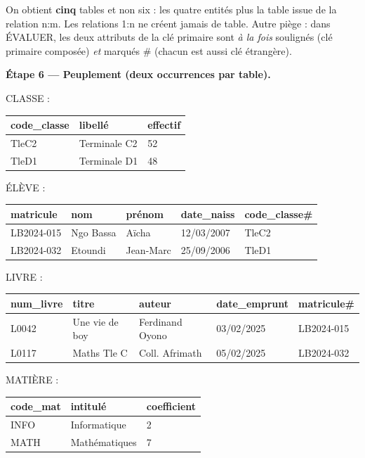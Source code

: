 \documentclass[11pt]{article}
\begin{document}
\begin{exoresolu}
\begin{attention}
On obtient \textbf{cinq} tables et non six : les quatre entités plus la table issue de la relation n:m. Les relations 1:n ne créent jamais de table. Autre piège : dans ÉVALUER, les deux attributs de la clé primaire sont \emph{à la fois} soulignés (clé primaire composée) \emph{et} marqués \# (chacun est aussi clé étrangère).
\end{attention}

\textbf{Étape 6 — Peuplement (deux occurrences par table).}

CLASSE :
\begin{center}
\begin{tabularx}{\linewidth}{|l|X|l|}
\hline
\rowcolor{popblueL} \textbf{code\_classe} & \textbf{libellé} & \textbf{effectif} \\
\hline
TleC2 & Terminale C2 & 52 \\
\hline
TleD1 & Terminale D1 & 48 \\
\hline
\end{tabularx}
\end{center}

ÉLÈVE :
\begin{center}
\begin{tabularx}{\linewidth}{|l|X|X|l|l|}
\hline
\rowcolor{popblueL} \textbf{matricule} & \textbf{nom} & \textbf{prénom} & \textbf{date\_naiss} & \textbf{code\_classe\#} \\
\hline
LB2024-015 & Ngo Bassa & Aïcha & 12/03/2007 & TleC2 \\
\hline
LB2024-032 & Etoundi & Jean-Marc & 25/09/2006 & TleD1 \\
\hline
\end{tabularx}
\end{center}

LIVRE :
\begin{center}
\begin{tabularx}{\linewidth}{|l|X|X|l|l|}
\hline
\rowcolor{popblueL} \textbf{num\_livre} & \textbf{titre} & \textbf{auteur} & \textbf{date\_emprunt} & \textbf{matricule\#} \\
\hline
L0042 & Une vie de boy & Ferdinand Oyono & 03/02/2025 & LB2024-015 \\
\hline
L0117 & Maths Tle C & Coll. Afrimath & 05/02/2025 & LB2024-032 \\
\hline
\end{tabularx}
\end{center}

MATIÈRE :
\begin{center}
\begin{tabularx}{\linewidth}{|l|X|l|}
\hline
\rowcolor{popblueL} \textbf{code\_mat} & \textbf{intitulé} & \textbf{coefficient} \\
\hline
INFO & Informatique & 2 \\
\hline
MATH & Mathématiques & 7 \\
\hline
\end{tabularx}
\end{center}


\end{exoresolu}
\end{document}
